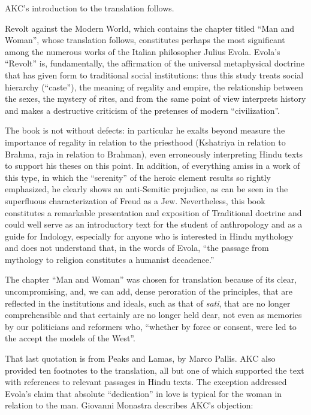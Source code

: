 AKC's introduction to the translation follows.

\begin{quotex}
Revolt against the Modern World, which contains the chapter titled ``Man and Woman'', whose translation follows, constitutes perhaps the most significant among the numerous works of the Italian philosopher Julius Evola. Evola's ``Revolt'' is, fundamentally, the affirmation of the universal metaphysical doctrine that has given form to traditional social institutions: thus this study treats social hierarchy (``caste''), the meaning of regality and empire, the relationship between the sexes, the mystery of rites, and from the same point of view interprets history and makes a destructive criticism of the pretenses of modern ``civilization''.

The book is not without defects: in particular he exalts beyond measure the importance of regality in relation to the priesthood (Kshatriya in relation to Brahma, raja in relation to Brahman), even erroneously interpreting Hindu texts to support his theses on this point. In addition, of everything amiss in a work of this type, in which the ``serenity'' of the heroic element results so rightly emphasized, he clearly shows an anti-Semitic prejudice, as can be seen in the superfluous characterization of Freud as a Jew. Nevertheless, this book constitutes a remarkable presentation and exposition of Traditional doctrine and could well serve as an introductory text for the student of anthropology and as a guide for Indology, especially for anyone who is interested in Hindu mythology and does not understand that, in the words of Evola, ``the passage from mythology to religion constitutes a humanist decadence.''

The chapter ``Man and Woman'' was chosen for translation because of its clear, uncompromising, and, we can add, dense peroration of the principles, that are reflected in the institutions and ideals, such as that of \emph{sati}, that are no longer comprehensible and that certainly are no longer held dear, not even as memories by our politicians and reformers who, ``whether by force or consent, were led to the accept the models of the West''.
\end{quotex}


That last quotation is from Peaks and Lamas, by Marco Pallis. AKC also provided ten footnotes to the translation, all but one of which supported the text with references to relevant passages in Hindu texts. The exception addressed Evola's claim that absolute ``dedication'' in love is typical for the woman in relation to the man. Giovanni Monastra describes AKC's objection:

